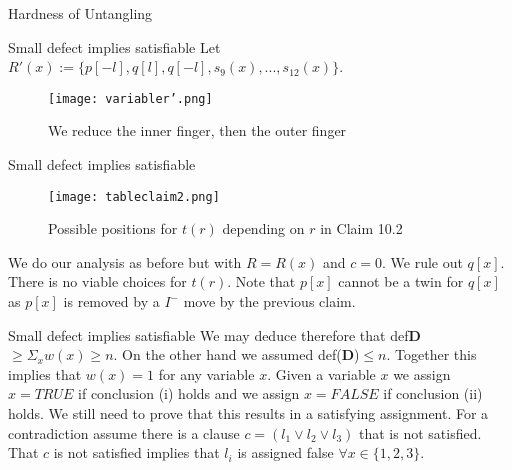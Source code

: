 \documentclass{beamer}
\begin{document}
\begin{section}{Hardness of Untangling}
\begin{frame}{Small defect implies satisfiable}
        Let $R'(x):=\{p[-l],q[l],q[-l],s_9(x),...,s_{12}(x)\}$.  
        \begin{figure}
            \texttt{[image: variabler'.png]}
            \caption{We reduce the inner finger, then the outer finger}
        \end{figure}
    \end{frame}{}
    
    \begin{frame}{Small defect implies satisfiable}
        \begin{figure}
            \texttt{[image: tableclaim2.png]}
            \caption{Possible positions for $t(r)$ depending on $r$ in Claim 10.2}
        \end{figure}
        
        We do our analysis as before but with $R=R(x)$ and $c=0$. We rule out $q[x]$. There is no viable choices for $t(r)$. Note that $p[x]$ cannot be a twin for $q[x]$ as $p[x]$ is removed by a $I^-$ move by the previous claim. 
    \end{frame}{}
    
    \begin{frame}{Small defect implies satisfiable}
        We may deduce therefore that def\textbf{D} $\geq \Sigma_x w(x) \geq n$. On the other hand we assumed def(\textbf{D})$\leq n$. Together this implies that $w(x)=1$ for any variable $x$. 
        \newline
        \newline
        Given a variable $x$ we assign $x=TRUE$ if conclusion (i) holds and we assign $x=FALSE$ if conclusion (ii) holds. We still need to prove that this results in a satisfying assignment. 
        \newline
        \newline
        For a contradiction assume there is a clause $c=(l_1\lor l_2 \lor l_3)$ that is not satisfied. That $c$ is not satisfied implies that $l_i$ is assigned false $\forall x \in \{1,2,3\}$.
    \end{frame}{}
    

\end{section}
\end{document}
